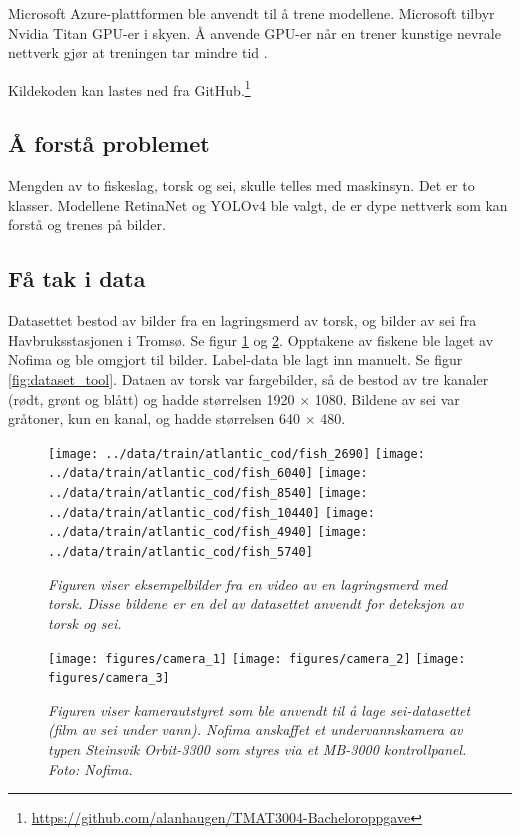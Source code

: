 Microsoft Azure-plattformen ble anvendt til å trene modellene. Microsoft tilbyr Nvidia Titan GPU-er i skyen. Å anvende GPU-er når en trener kunstige nevrale nettverk gjør at treningen tar mindre tid \cite{Dean m.fl. 2012 s. 1}.

Kildekoden kan lastes ned fra GitHub.\footnote{\url{https://github.com/alanhaugen/TMAT3004-Bacheloroppgave}}

\subsection{Å forstå problemet}

Mengden av to fiskeslag, torsk og sei, skulle telles med maskinsyn. Det er to klasser. Modellene RetinaNet og YOLOv4 ble valgt, de er dype nettverk som kan forstå og trenes på bilder.

\subsection{Få tak i data}
\label{part:data}

Datasettet bestod av bilder fra en lagringsmerd av torsk, og bilder av sei fra Havbruksstasjonen i Tromsø. Se figur \ref{fig:data} og \ref{fig:nofima}. Opptakene av fiskene ble laget av Nofima og ble omgjort til bilder. Label-data ble lagt inn manuelt. Se figur \ref{fig:dataset_tool}. Dataen av torsk var fargebilder, så de bestod av tre kanaler (rødt, grønt og blått) og hadde størrelsen 1920 $\times$ 1080. Bildene av sei var gråtoner, kun en kanal, og hadde størrelsen 640 $\times$ 480. %

\begin{figure}[h!]
\begin{center} 
\texttt{[image: ../data/train/atlantic\_cod/fish\_2690]}
\texttt{[image: ../data/train/atlantic\_cod/fish\_6040]}
\texttt{[image: ../data/train/atlantic\_cod/fish\_8540]}
\texttt{[image: ../data/train/atlantic\_cod/fish\_10440]}
\texttt{[image: ../data/train/atlantic\_cod/fish\_4940]}
\texttt{[image: ../data/train/atlantic\_cod/fish\_5740]}
\caption{\small \sl Figuren viser eksempelbilder fra en video av en lagringsmerd med torsk. Disse bildene er en del av datasettet anvendt for deteksjon av torsk og sei. \cite{Nofima 2020} \label{fig:data}} 
\end{center} 
\end{figure} 

\begin{figure}[h!]
\begin{center} 
\texttt{[image: figures/camera\_1]}
\texttt{[image: figures/camera\_2]}
\texttt{[image: figures/camera\_3]}
\caption{\small \sl Figuren viser kamerautstyret som ble anvendt til å lage sei-datasettet (film av sei under vann). Nofima anskaffet et undervannskamera av typen Steinsvik Orbit-3300 som styres via et MB-3000 kontrollpanel. Foto: Nofima. \cite{Lindberg og Evensen 2020} \label{fig:nofima}} 
\end{center} 
\end{figure} 

